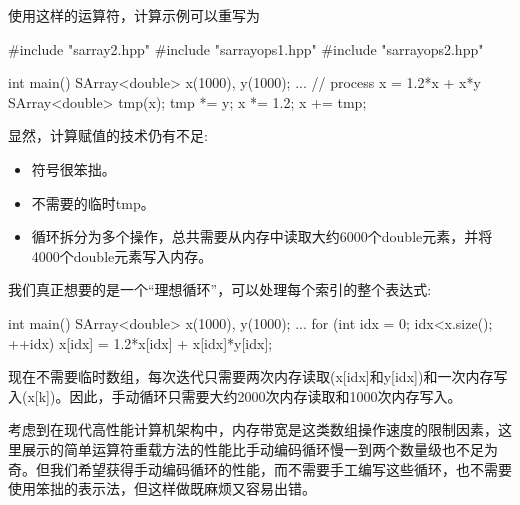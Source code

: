 使用这样的运算符，计算示例可以重写为

\begin{cpp}
#include "sarray2.hpp"
#include "sarrayops1.hpp"
#include "sarrayops2.hpp"

int main()
{
	SArray<double> x(1000), y(1000);
	...
	// process x = 1.2*x + x*y
	SArray<double> tmp(x);
	tmp *= y;
	x *= 1.2;
	x += tmp;
}
\end{cpp}

显然，计算赋值的技术仍有不足:

\begin{itemize}
\item 
符号很笨拙。

\item 
不需要的临时tmp。

\item 
循环拆分为多个操作，总共需要从内存中读取大约6000个double元素，并将4000个double元素写入内存。
\end{itemize}

我们真正想要的是一个“理想循环”，可以处理每个索引的整个表达式:

\begin{cpp}
int main()
{
	SArray<double> x(1000), y(1000);
	...
	for (int idx = 0; idx<x.size(); ++idx) {
		x[idx] = 1.2*x[idx] + x[idx]*y[idx];
	}
}
\end{cpp}

现在不需要临时数组，每次迭代只需要两次内存读取(x[idx]和y[idx])和一次内存写入(x[k])。因此，手动循环只需要大约2000次内存读取和1000次内存写入。

考虑到在现代高性能计算机架构中，内存带宽是这类数组操作速度的限制因素，这里展示的简单运算符重载方法的性能比手动编码循环慢一到两个数量级也不足为奇。但我们希望获得手动编码循环的性能，而不需要手工编写这些循环，也不需要使用笨拙的表示法，但这样做既麻烦又容易出错。















